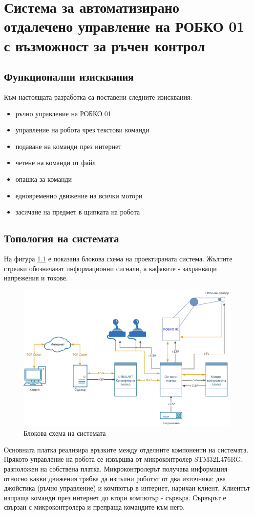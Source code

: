 \chapter{Система за автоматизирано отдалечено управление на РОБКО 01 с
възможност за ръчен контрол}
\section{Функционални изисквания}
Към настоящата разработка са поставени следните изисквания:
\begin{itemize}
    \item ръчно управление на РОБКО 01
    \item управление на робота чрез текстови команди
    \item подаване на команди през интернет
    \item четене на команди от файл
    \item опашка за команди
    \item едновременно движение на всички мотори
    \item засичане на предмет в щипката на робота
\end{itemize}
\section{Топология на системата}
На фигура \ref{fig:system} е показана блокова схема на проектираната система. Жълтите стрелки обозначават информационни сигнали, а кафявите - захранващи напрежения и токове.\\
\begin{figure}[!htbp]
    \centering
    \includegraphics[angle=90,origin=center,width=\linewidth]{pictures/robko_system_diagram.png}
    \caption{Блокова схема на системата}
    \label{fig:system}
\end{figure}
\indent{}
Основната платка реализира връзките между отделните компоненти на системата. Прякото управление на робота се извършва от микроконтролер STM32L476RG, разположен на собствена платка. Микроконтролерът получава информация относно какви движения трябва да изпълни роботът от два източника: два джойстика (ръчно управление) и компютър в интернет, наричан клиент. Клиентът изпраща команди през интернет до втори компютър - сървъра. Сървърът е свързан с микроконтролера и препраща командите към него.\\
\indent{}
